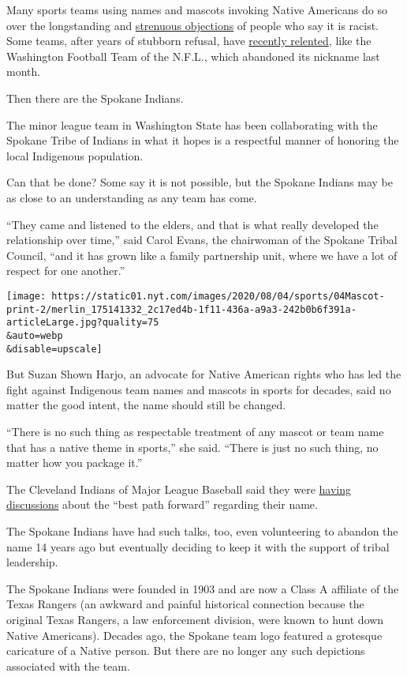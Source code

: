 Many sports teams using names and mascots invoking Native Americans do
so over the longstanding and
\href{https://www.nytimes.com/2020/07/10/sports/football/washington-redskins-name-change-mascots.html}{strenuous
objections} of people who say it is racist. Some teams, after years of
stubborn refusal, have
\href{https://www.nytimes.com/2020/07/23/sports/football/washington-football-team-name-logo.html}{recently
relented}, like the Washington Football Team of the N.F.L., which
abandoned its nickname last month.

Then there are the Spokane Indians.

The minor league team in Washington State has been collaborating with
the Spokane Tribe of Indians in what it hopes is a respectful manner of
honoring the local Indigenous population.

Can that be done? Some say it is not possible, but the Spokane Indians
may be as close to an understanding as any team has come.

``They came and listened to the elders, and that is what really
developed the relationship over time,'' said Carol Evans, the chairwoman
of the Spokane Tribal Council, ``and it has grown like a family
partnership unit, where we have a lot of respect for one another.''

\texttt{[image: https://static01.nyt.com/images/2020/08/04/sports/04Mascot-print-2/merlin\_175141332\_2c17ed4b-1f11-436a-a9a3-242b0b6f391a-articleLarge.jpg?quality=75\\\&auto=webp\\\&disable=upscale]}

But Suzan Shown Harjo, an advocate for Native American rights who has
led the fight against Indigenous team names and mascots in sports for
decades, said no matter the good intent, the name should still be
changed.

``There is no such thing as respectable treatment of any mascot or team
name that has a native theme in sports,'' she said. ``There is just no
such thing, no matter how you package it.''

The Cleveland Indians of Major League Baseball said they were
\href{https://www.nytimes.com/2020/07/03/sports/baseball/cleveland-indians-name-change.html}{having
discussions} about the ``best path forward'' regarding their name.

The Spokane Indians have had such talks, too, even volunteering to
abandon the name 14 years ago but eventually deciding to keep it with
the support of tribal leadership.

The Spokane Indians were founded in 1903 and are now a Class A affiliate
of the Texas Rangers (an awkward and painful historical connection
because the original Texas Rangers, a law enforcement division, were
known to hunt down Native Americans). Decades ago, the Spokane team logo
featured a grotesque caricature of a Native person. But there are no
longer any such depictions associated with the team.

